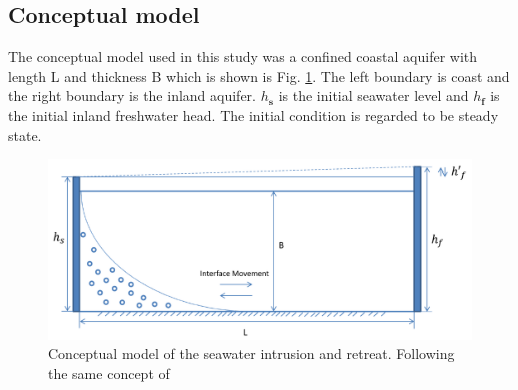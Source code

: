 \documentclass[review]{elsarticle}
\newcommand{\mbf}[1]{{\mathbf{#1}}}%
\begin{document}
\subsection{Conceptual model}

The conceptual model used in this study was a confined coastal aquifer with length L and thickness B which is shown is Fig. \ref{fig:seawater_intrusion}. The left boundary is coast and the right boundary is the inland aquifer. $h_\mbf{s}$ is the initial seawater level and $h_\mbf{f}$ is the initial inland freshwater head. The initial condition is regarded to be steady state. 
\begin{figure}
\centering
\includegraphics[width=1.0\textwidth]{figures/seawater_intrusion}
\caption{Conceptual model of the seawater intrusion and retreat. Following the same concept of \cite{lu2013timescales}}
\label{fig:seawater_intrusion}
\end{figure}
\end{document}
